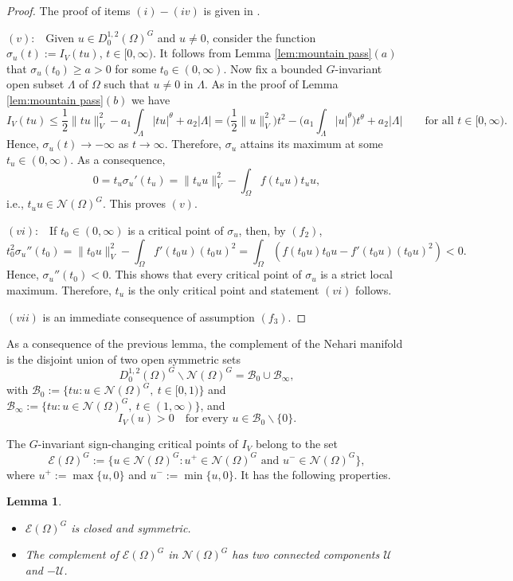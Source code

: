 \documentclass[10pt,letterpaper]{article}
\newtheorem{lemma}[theorem]{Lemma}
\numberwithin{equation}{section}
\def\io{\int_{\Omega}}
\def\o{\Omega}
\def\cB{\mathcal{B}}
\def\cE{\mathcal{E}}
\def\cN{\mathcal{N}}
\def\cU{\mathcal{U}}
\begin{document}
\begin{proof}
The proof of items $(i)-(iv)$ is given in \cite[Lemma 3.2]{cm}.

$(v):$ \ Given $u\in D^{1,2}_0(\o)^G$ and $u\neq 0$, consider the function $\sigma_u(t):=I_V(tu)$, $t\in[0,\infty)$. It follows from Lemma \ref{lem:mountain pass}$(a)$ that $\sigma_u(t_0)\geq a>0$ for some $t_0\in(0,\infty)$. Now fix a bounded $G$-invariant open subset $\Lambda$ of $\o$ such that $u\neq 0$ in $\Lambda$. As in the proof of Lemma \ref{lem:mountain pass}$(b)$ we have
$$I_V(tu)\leq\frac{1}{2}\|tu\|_V^2-a_1\int_{\Lambda}|tu|^\theta+a_2|\Lambda|=\Big(\frac{1}{2}\|u\|_V^2\Big)t^2-\Big(a_1\int_{\Lambda}|u|^\theta\Big) t^\theta+a_2|\Lambda|\qquad\text{for all \ }t\in[0,\infty).$$
Hence, $\sigma_u(t)\to -\infty$ as $t\to\infty$. Therefore, $\sigma_u$ attains its maximum at some $t_u\in(0,\infty)$. As a consequence,
$$0=t_u\sigma_u'(t_u)=\|t_uu\|_V^2-\io f(t_uu)t_uu,$$
i.e., $t_uu\in \cN(\o)^G$. This proves $(v)$.

$(vi):$ \ If $t_0\in(0,\infty)$ is a critical point of $\sigma_u$, then, by $(f_2)$,
$$t_0^2\sigma_u''(t_0)=\|t_0u\|_V^2-\io f'(t_0u)(t_0u)^2=\io (f(t_0u)t_0u-f'(t_0u)(t_0u)^2)<0.$$
Hence, $\sigma_u''(t_0)<0$. This shows that every critical point of $\sigma_u$ is a strict local maximum. Therefore, $t_u$ is the only critical point and statement $(vi)$ follows. 

$(vii)$ is an immediate consequence of assumption $(f_3)$.
\end{proof}

As a consequence of the previous lemma, the complement of the Nehari manifold is the disjoint union of two open symmetric sets
\begin{equation} \label{eq:complement of nehari}
D^{1,2}_0(\o)^G\smallsetminus \cN(\o)^G = \cB_0 \cup \cB_\infty,
\end{equation}
with $\cB_0:=\{tu:u\in\cN(\o)^G, \ t\in[0,1)\}$ and $\cB_\infty:=\{tu:u\in\cN(\o)^G, \ t\in(1,\infty)\}$, and 
\begin{equation} \label{eq:I>0 on B0}
I_V(u)>0\quad\text{for every \ }u\in\cB_0\smallsetminus\{0\}.
\end{equation}

The $G$-invariant sign-changing critical points of $I_V$ belong to the set
$$\cE(\o)^G:= \{u\in\cN(\o)^G : u^+\in\cN(\o)^G\text{ and }u^-\in\cN(\o)^G\},$$
where $u^+:=\max\{u,0\}$ and $u^-:=\min\{u,0\}$. It has the following properties.

\begin{lemma} \label{lem:N-E}
\begin{itemize}
\item[$(i)$] $\cE(\o)^G$ is closed and symmetric.
\item[$(ii)$] The complement of $\cE(\o)^G$ in $\cN(\o)^G$ has two connected components $\cU$ and $-\cU$.
\end{itemize}
\end{lemma}
\end{document}
